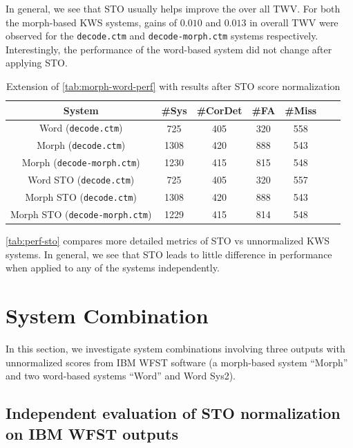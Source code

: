 \documentclass[a4paper,oneside,reqno]{amsart}
\begin{document}
In general, we see that STO usually helps improve the over all TWV\@. For
both the morph-based KWS systems, gains of $0.010$ and $0.013$ in overall
TWV were observed for the \texttt{decode.ctm} and \texttt{decode-morph.ctm}
systems respectively. Interestingly, the performance of the word-based
system did not change after applying STO.

\begin{table}
  \begin{tabular}{ccccccc}
    \toprule
    System                                & \#Sys & \#CorDet & \#FA & \#Miss \\
    \midrule
    Word (\texttt{decode.ctm})            & 725   & 405      & 320  & 558\\
    Morph (\texttt{decode.ctm})           & 1308  & 420      & 888  & 543\\
    Morph (\texttt{decode-morph.ctm})     & 1230  & 415      & 815  & 548\\
    \hline
    Word STO (\texttt{decode.ctm})        & 725   & 405      & 320  & 557\\
    Morph STO (\texttt{decode.ctm})       & 1308  & 420      & 888  & 543\\
    Morph STO (\texttt{decode-morph.ctm}) & 1229  & 415      & 814  & 548\\
    \bottomrule
  \end{tabular}
  \caption{Extension of \autoref{tab:morph-word-perf} with results after STO score normalization}
  \label{tab:perf-sto}
\end{table}

\autoref{tab:perf-sto} compares more detailed metrics of STO vs unnormalized KWS systems. In
general, we see that STO leads to little difference in performance when applied to any of the
systems independently.

\section{System Combination}

In this section, we investigate system combinations involving three outputs
with unnormalized scores from IBM WFST software (a morph-based system ``Morph''
and two word-based systems ``Word'' and Word Sys2).

\subsection{Independent evaluation of STO normalization on IBM WFST outputs}
\end{document}
